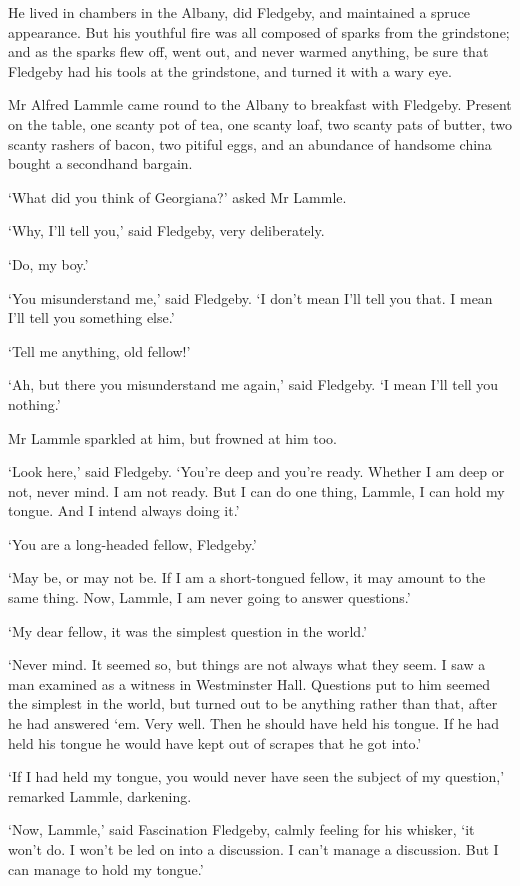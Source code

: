 He lived in chambers in the Albany, did Fledgeby, and maintained a
spruce appearance. But his youthful fire was all composed of sparks from
the grindstone; and as the sparks flew off, went out, and never warmed
anything, be sure that Fledgeby had his tools at the grindstone, and
turned it with a wary eye.

Mr Alfred Lammle came round to the Albany to breakfast with Fledgeby.
Present on the table, one scanty pot of tea, one scanty loaf, two scanty
pats of butter, two scanty rashers of bacon, two pitiful eggs, and an
abundance of handsome china bought a secondhand bargain.

‘What did you think of Georgiana?’ asked Mr Lammle.

‘Why, I’ll tell you,’ said Fledgeby, very deliberately.

‘Do, my boy.’

‘You misunderstand me,’ said Fledgeby. ‘I don’t mean I’ll tell you that.
I mean I’ll tell you something else.’

‘Tell me anything, old fellow!’

‘Ah, but there you misunderstand me again,’ said Fledgeby. ‘I mean I’ll
tell you nothing.’

Mr Lammle sparkled at him, but frowned at him too.

‘Look here,’ said Fledgeby. ‘You’re deep and you’re ready. Whether I am
deep or not, never mind. I am not ready. But I can do one thing, Lammle,
I can hold my tongue. And I intend always doing it.’

‘You are a long-headed fellow, Fledgeby.’

‘May be, or may not be. If I am a short-tongued fellow, it may amount to
the same thing. Now, Lammle, I am never going to answer questions.’

‘My dear fellow, it was the simplest question in the world.’

‘Never mind. It seemed so, but things are not always what they seem. I
saw a man examined as a witness in Westminster Hall. Questions put to
him seemed the simplest in the world, but turned out to be anything
rather than that, after he had answered ‘em. Very well. Then he should
have held his tongue. If he had held his tongue he would have kept out
of scrapes that he got into.’

‘If I had held my tongue, you would never have seen the subject of my
question,’ remarked Lammle, darkening.

‘Now, Lammle,’ said Fascination Fledgeby, calmly feeling for his
whisker, ‘it won’t do. I won’t be led on into a discussion. I can’t
manage a discussion. But I can manage to hold my tongue.’

